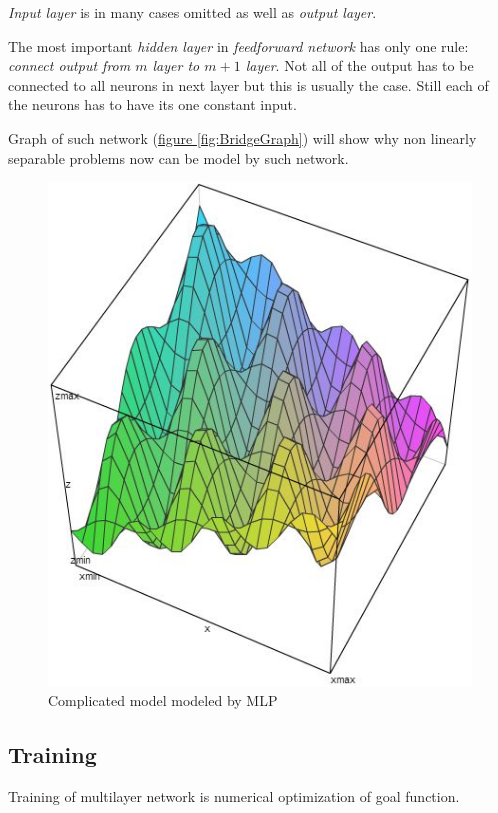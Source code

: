 \textit{Input layer} is in many cases omitted as well as \textit{output layer}.

The most important \textit{hidden layer} in \textit{feedforward network} has only one rule: \textit{connect output from $m$ layer to $m+1$ layer}. Not all of the output has to be connected to all neurons in next layer but this is usually the case. Still each of the neurons has to have its one constant input.

Graph of such network (\hyperref[fig:BridgeGraph]{figure \ref{fig:BridgeGraph}}) will show why non linearly separable problems now can be model by such network.

\begin{figure}[!h]
    \centering
    \includegraphics[scale=0.8]{Media/SolutionGraph.png}
    \caption{Complicated model modeled by MLP}
    \label{fig:SolutionGraph}
\end{figure}

\newpage
\subsection{Training}
\label{sec:Training}

Training of multilayer network is numerical optimization of goal function. 